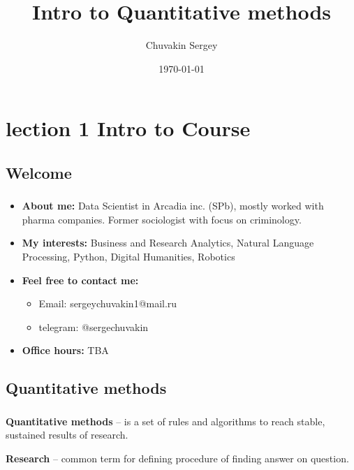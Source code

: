 \documentclass[t, 11pt]{beamer}
\title{Intro to Quantitative methods}
\subtitle{}
\author{Chuvakin Sergey}
\date{\today}
\institute[<<Anthropology>>]{<<School of Advanced Studies>>}
\begin{document}
	
	\frame[plain]{\titlepage}
	\section{lection 1 Intro to Course}
	
	
	\subsection{Welcome}
	\begin{frame} \label {welcome}
		\frametitle{\insertsection} 
		\frametitle{\insertsubsection} 
		\begin{itemize}
			\item \textbf{About me:} Data Scientist in Arcadia inc. (SPb), mostly worked with pharma companies. Former sociologist with focus on criminology. 
			\item \textbf{My interests:} Business and Research Analytics, Natural Language Processing, Python, Digital Humanities, Robotics
			\item \textbf{Feel free to contact me:} \begin{itemize}
				\item Email: sergeychuvakin1@mail.ru
				\item telegram: @sergechuvakin
			\end{itemize}
			\item \textbf{Office hours:} TBA
		\end{itemize}
	\end{frame}
	
	\subsection{Quantitative methods}
	\begin{frame}\label{}
		\frametitle{\insertsection}
		\frametitle{\insertsubsection}
		
		\textbf{Quantitative methods} -- is a set of rules and algorithms to reach stable, sustained results of research. 
		
		\textbf{Research} -- common term for defining procedure of finding answer on question.
		
	\end{frame}
	
	
	
\end{document}
